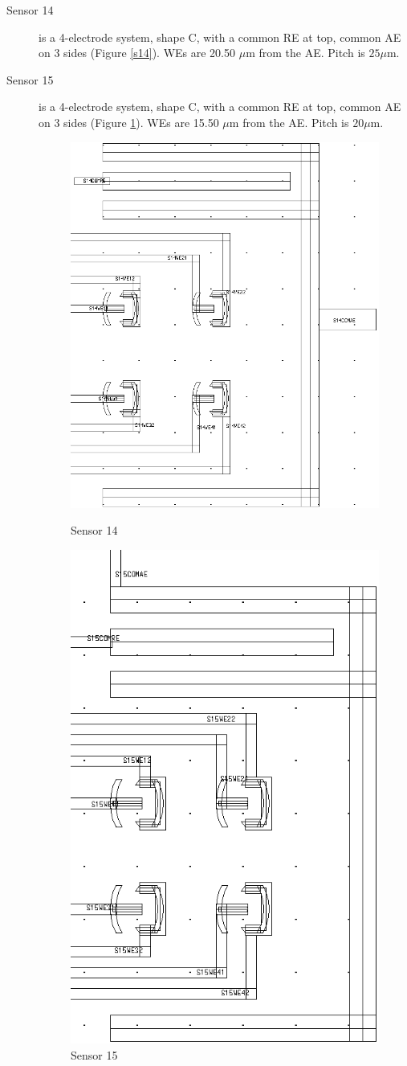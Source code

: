 \begin{description}
\item[Sensor 14] is a 4-electrode system, shape C, with a common RE at top, common AE on 3 sides (Figure \ref{s14}). WEs are 20.50 $\mu \mathrm{m}$ from the AE. Pitch is $25 \mu \mathrm{m}$.
\item[Sensor 15] is a 4-electrode system, shape C, with a common RE at top, common AE on 3 sides (Figure \ref{s15}). WEs are 15.50 $\mu \mathrm{m}$ from the AE. Pitch is $20 \mu \mathrm{m}$.

\begin{figure}
	\begin{minipage}{0.5\linewidth}
		\centering
		\includegraphics[width=0.6\linewidth]{figures/s14.png}
		\caption{Sensor 14}
		\label{s14}
	\end{minipage}
	\begin{minipage}{0.5\linewidth}
		\centering
		\includegraphics[width=0.6\linewidth]{figures/s15.png}
		\caption{Sensor 15}
		\label{s15}
	\end{minipage}
\end{figure}


\end{description}
